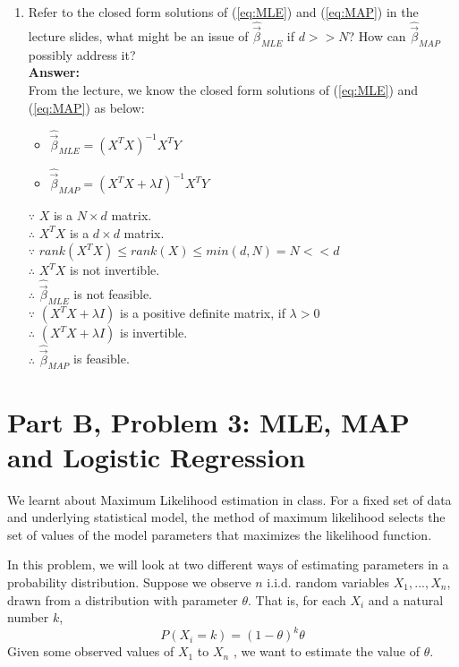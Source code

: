 \documentclass{article}
\begin{document}
\begin{enumerate}
	\item Refer to the closed form solutions of (\ref{eq:MLE}) and (\ref{eq:MAP}) in the lecture slides, what might be an issue of $\hat{\vec{\beta}}_{MLE}$ if $d>>N$? How can $\hat{\vec{\beta}}_{MAP}$ possibly address it?
	\\\textbf{Answer:}\\
	From the lecture, we know the closed form solutions of (\ref{eq:MLE}) and (\ref{eq:MAP}) as below:
	\begin{itemize}
		\item $\hat{\vec{\beta}}_{MLE} = (X^TX)^{-1}X^TY$
		\item $\hat{\vec{\beta}}_{MAP} = (X^TX+\lambda I)^{-1}X^TY$
	\end{itemize}
	$\because$ $X$ is a $N\times d$ matrix.\\
	$\therefore$ $X^TX$ is a $d \times d$ matrix. \\
	$\because$ $rank(X^TX) \leq rank(X) \leq min(d,N) = N << d$ \\
	$\therefore$ $X^TX$ is not invertible.\\
	$\therefore$ $\hat{\vec{\beta}}_{MLE}$ is not feasible. \\
	$\because$ $(X^TX+\lambda I)$ is a positive definite matrix, if $\lambda>0$ \\
	$\therefore$ $(X^TX+\lambda I)$ is invertible. \\
	$\therefore$ $\hat{\vec{\beta}}_{MAP}$ is feasible.
\end{enumerate}

\newpage

\section*{Part B, Problem 3: MLE, MAP and Logistic Regression}

We learnt about Maximum Likelihood estimation in class. For a fixed set of data and underlying statistical model, the method of maximum likelihood selects the set of values of the model parameters that maximizes the likelihood function.

In this problem, we will look at two different ways of estimating parameters in a probability distribution. Suppose we observe $n$ i.i.d. random variables $X_1,...,X_n$, drawn from a distribution with parameter $\theta$. That is, for each $X_i$ and a natural number $k$,
$$P(X_i=k)=(1-\theta)^k\theta$$
Given some observed values of $X_1$ to $X_n$ , we want to estimate the value of $\theta$.
\end{document}
